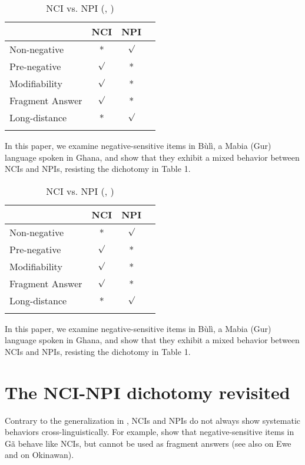 \documentclass[output=paper,colorlinks,citecolor=brown]{langscibook}
\begin{document}
\begin{table}
  \begin{tabular}{lccl}
\lspbottomrule
 & NCI & NPI    \\
   \midrule
 Non-negative & *  & $\surd$   \\
Pre-negative &  $\surd$ & *   \\
Modifiability & $\surd$  & *    \\
Fragment Answer & $\surd$ & *   \\
Long-distance & *  & $\surd$    \\
\lspbottomrule
  \end{tabular}
  \caption{NCI vs. NPI (\citealt{Vallduvi1994}, \citealt{Giannakidou2000})}
  \label{nci-npia}
\end{table}
In this paper, we examine negative-sensitive items in Bùlì, a Mabia (Gur) language spoken in Ghana, and show that they exhibit a mixed behavior between NCIs and NPIs, resisting the dichotomy in Table 1.


\begin{table}
  \begin{tabular}{lccl}
\lspbottomrule
 & NCI & NPI    \\
   \midrule
 Non-negative & *  & $\surd$   \\
Pre-negative &  $\surd$ & *   \\
Modifiability & $\surd$  & *    \\
Fragment Answer & $\surd$ & *   \\
Long-distance & *  & $\surd$    \\
\lspbottomrule
  \end{tabular}
  \caption{NCI vs. NPI (\citealt{Vallduvi1994}, \citealt{Giannakidou2000})}
  \label{nci-npib}
\end{table}
In this paper, we examine negative-sensitive items in Bùlì, a Mabia (Gur) language spoken in Ghana, and show that they exhibit a mixed behavior between NCIs and NPIs, resisting the dichotomy in Table 1.

\section{The NCI-NPI dichotomy revisited}

Contrary to the generalization in , NCIs and NPIs do not always show systematic behaviors cross-linguistically.  For example, \cite{KorsahMurphy2017Ga} show that negative-sensitive items in G\~a behave like NCIs, but cannot be used as fragment answers (see also \citealt{CollinsEtAl2017} on Ewe and \cite{Hiraiwa2019} on Okinawan).
\end{document}
